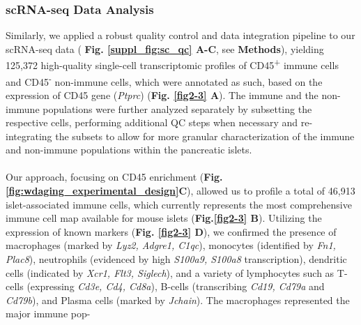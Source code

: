 \subsubsection{scRNA-seq Data Analysis}
Similarly, we applied a robust quality control and data integration pipeline to our scRNA-seq data ( \textbf{Fig. \ref{suppl_fig:sc_qc} A-C}, see \textbf{Methods}), yielding 125,372 high-quality single-cell transcriptomic profiles of CD45\textsuperscript{+} immune cells and CD45\textsuperscript{-} non-immune cells, which were annotated as such, based on the expression of CD45 gene (\textit{Ptprc}) (\textbf{Fig. \ref{fig2-3} A}). The immune and the non-immune populations were further analyzed separately by subsetting the respective cells, performing additional QC steps when necessary and re-integrating the subsets to allow for more granular characterization of the immune and non-immune populations within the pancreatic islets.\\\\
Our approach, focusing on CD45 enrichment  (\textbf{Fig.\ref{fig:wdaging_experimental_design}C}), allowed us to profile a total of 46,913 islet-associated immune cells, which currently represents the most comprehensive immune cell map available for mouse islets (\textbf{Fig.\ref{fig2-3} B}). Utilizing the expression of known markers (\textbf{Fig. \ref{fig2-3} D}), we confirmed the presence of macrophages (marked by \textit{Lyz2, Adgre1, C1qc}), monocytes (identified by \textit{Fn1, Plac8}), neutrophils (evidenced by high \textit{S100a9, S100a8} transcription), dendritic cells (indicated by \textit{Xcr1, Flt3, Siglech}), and a variety of lymphocytes such as T-cells (expressing \textit{Cd3e, Cd4, Cd8a}), B-cells (transcribing \textit{Cd19, Cd79a} and \textit{Cd79b}), and Plasma cells (marked by \textit{Jchain}). The macrophages represented the major immune pop-

